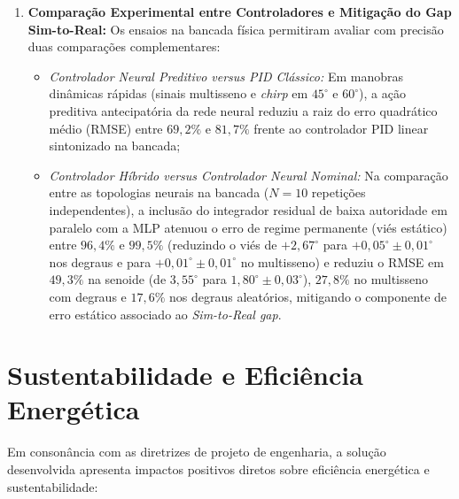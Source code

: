 \begin{enumerate}
    \item \textbf{Comparação Experimental entre Controladores e Mitigação do Gap Sim-to-Real:} Os ensaios na bancada física permitiram avaliar com precisão duas comparações complementares:
    \begin{itemize}
        \item \textit{Controlador Neural Preditivo versus PID Clássico:} Em manobras dinâmicas rápidas (sinais multisseno e \textit{chirp} em $45^\circ$ e $60^\circ$), a ação preditiva antecipatória da rede neural reduziu a raiz do erro quadrático médio (RMSE) entre $69{,}2\%$ e $81{,}7\%$ frente ao controlador PID linear sintonizado na bancada;
        \item \textit{Controlador Híbrido versus Controlador Neural Nominal:} Na comparação entre as topologias neurais na bancada ($N=10$ repetições independentes), a inclusão do integrador residual de baixa autoridade em paralelo com a MLP atenuou o erro de regime permanente (viés estático) entre $96{,}4\%$ e $99{,}5\%$ (reduzindo o viés de $+2{,}67^\circ$ para $+0{,}05^\circ \pm 0{,}01^\circ$ nos degraus e para $+0{,}01^\circ \pm 0{,}01^\circ$ no multisseno) e reduziu o RMSE em $49{,}3\%$ na senoide (de $3{,}55^\circ$ para $1{,}80^\circ \pm 0{,}03^\circ$), $27{,}8\%$ no multisseno com degraus e $17{,}6\%$ nos degraus aleatórios, mitigando o componente de erro estático associado ao \textit{Sim-to-Real gap}.
    \end{itemize}
\end{enumerate}

\section{Sustentabilidade e Eficiência Energética}
\label{sec:conclusao_sustentabilidade}

Em consonância com as diretrizes de projeto de engenharia, a solução desenvolvida apresenta impactos positivos diretos sobre eficiência energética e sustentabilidade:

